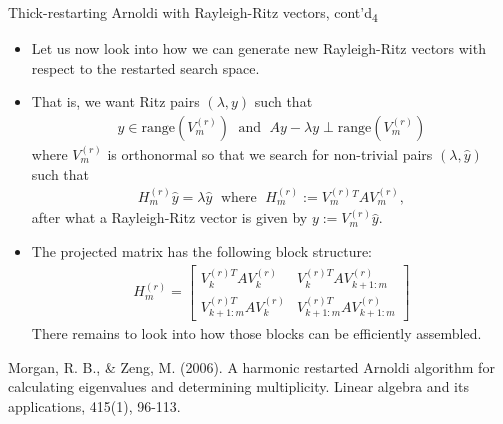\documentclass[t,usepdftitle=false]{beamer}
\begin{document}
\begin{frame}{Thick-restarting Arnoldi with Rayleigh-Ritz vectors, cont'd\textsubscript{4}}
\begin{itemize}
\item Let us now look into how we can generate new Rayleigh-Ritz vectors with respect to the restarted search space.
\item[] That is, we want Ritz pairs $(\lambda,y)$ such that
\begin{align*}
y\in\text{range}(V_m^{(r)})
\;\text{ and }\;
Ay-\lambda y
\perp
\text{range}(V_m^{(r)})
\end{align*}
where $V_m^{(r)}$ is orthonormal so that we search for non-trivial pairs $(\lambda,\hat{y})$ such that
\begin{align*}
H_m^{(r)}\hat{y}=\lambda\hat{y}
\;\text{ where }\;
H_m^{(r)}:=V_m^{(r)}{}^TAV_m^{(r)},
\end{align*}
after what a Rayleigh-Ritz vector is given by $y:=V_m^{(r)}\hat{y}$.
\item[] The projected matrix has the following block structure:
\begin{align*}
H_m^{(r)}
=
\begin{bmatrix}
V_k^{(r)T}AV_k^{(r)}&V_k^{(r)T}AV_{k+1:m}^{(r)}\\
V_{k+1:m}^{(r)T}AV_k^{(r)}&V_{k+1:m}^{(r)T}AV_{k+1:m}^{(r)}
\end{bmatrix}
\end{align*}
There remains to look into how those blocks can be efficiently assembled.
\end{itemize}\smallskip
\tiny{Morgan, R. B., \& Zeng, M. (2006). A harmonic restarted Arnoldi algorithm for calculating eigenvalues and determining
multiplicity. Linear algebra and its applications, 415(1), 96-113.}
\end{frame}
\end{document}
